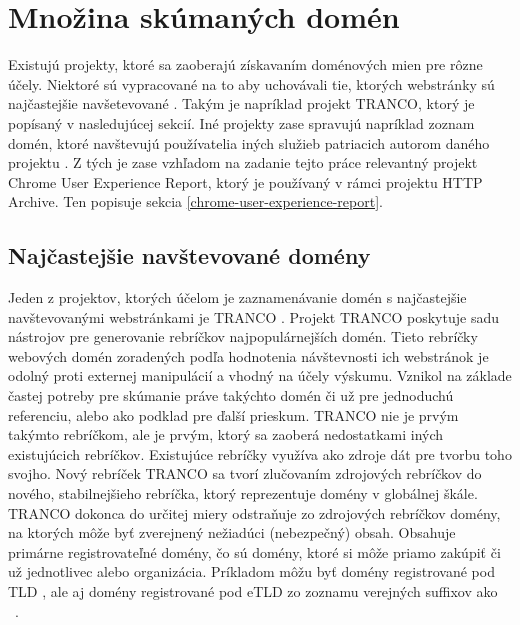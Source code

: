 \pagebreak

\section{Množina skúmaných domén}
\label{tranco}

Existujú projekty, ktoré sa zaoberajú získavaním doménových mien pre rôzne účely.
Niektoré sú vypracované na to aby uchovávali tie, ktorých webstránky sú najčastejšie navšetevované \cite{hacker-target-website-lists-overview, tranco}.
Takým je napríklad projekt TRANCO, ktorý je popísaný v nasledujúcej sekcií.
Iné projekty zase spravujú napríklad zoznam domén, ktoré navštevujú používatelia iných služieb patriacich autorom daného projektu \cite{chrome-crux}. 
Z tých je zase vzhľadom na zadanie tejto práce relevantný projekt Chrome User Experience Report, ktorý je používaný v rámci projektu HTTP Archive. 
Ten popisuje sekcia \ref{chrome-user-experience-report}.


\subsection{Najčastejšie navštevované domény}

Jeden z projektov, ktorých účelom je zaznamenávanie domén s najčastejšie navštevovanými webstránkami je TRANCO \cite{tranco}.
Projekt TRANCO poskytuje sadu nástrojov pre generovanie rebríčkov najpopulárnejších domén. 
Tieto rebríčky webových domén zoradených podľa hodnotenia návštevnosti ich webstránok je odolný proti externej manipulácií a vhodný na účely výskumu. 
Vznikol na základe častej potreby pre skúmanie práve takýchto domén či už pre jednoduchú referenciu, alebo ako podklad pre ďalší prieskum.
TRANCO nie je prvým takýmto rebríčkom, ale je prvým, ktorý sa zaoberá nedostatkami iných existujúcich rebríčkov.
Existujúce rebríčky využíva ako zdroje dát pre tvorbu toho svojho.
Nový rebríček TRANCO sa tvorí zlučovaním zdrojových rebríčkov do nového, stabilnejšieho rebríčka, ktorý reprezentuje domény v globálnej škále.
TRANCO dokonca do určitej miery odstraňuje zo zdrojových rebríčkov domény, na ktorých môže byť zverejnený nežiadúci (nebezpečný) obsah.
Obsahuje primárne registrovateľné domény, čo sú domény, ktoré si môže priamo zakúpiť či už jednotlivec alebo organizácia. 
Príkladom môžu byť domény registrované pod TLD , ale aj domény registrované pod eTLD zo zoznamu verejných suffixov ako \mbox{ \cite{tranco}}.

